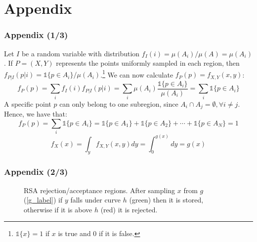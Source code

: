\documentclass{beamer}
\begin{document}
\section{Appendix}
\begin{frame}


\frametitle{Appendix (1/3)}
Let $I$ be a random variable with distribution $f_I(i)=\mu(A_i)/\mu(A)=\mu(A_i)$. If $P=(X,Y)$ represents the points uniformly sampled in each region, then $f_{P|I}(p|i)=\mathbb{1}\{p \in A_i\}/\mu(A_i)$.\footnote{$\mathbb{1}\{x\}=1$ if $x$ is true and $0$ if it is false.} We can now calculate $f_P(p)=f_{X,Y}(x,y)$:
$$f_P(p)=\sum_i f_I(i)f_{P|I}(p|i)=\sum_i \mu(A_i)\frac{\mathbb{1}\{p \in A_i\}}{\mu(A_i)}=\sum_i \mathbb{1}\{p \in A_i\}$$
A specific point $p$ can only belong to one subregion, since $A_i \cap A_j=\emptyset, \forall i\neq j$. Hence, we have that: 
$$f_P(p)=\sum_i \mathbb{1}\{p \in A_i\} = \mathbb{1}\{p \in A_1\} + \mathbb{1}\{p \in A_2\} + \dotsb + \mathbb{1}\{p \in A_N\} = 1$$
$$f_X(x)=\int_y f_{X,Y}(x,y)dy = \int_0^{g(x)}dy = g(x)$$
\end{frame}

\begin{frame}


\frametitle{Appendix (2/3)}
\begin{figure}[h]
\centering
{}
	\caption{RSA rejection/acceptance regions. After sampling $x$ from $g$ (\ref{g_label}) if $y$ falls under curve $h$ (green) then it is stored, otherwise if it is above $h$ (red) it is rejected.}
	\label{fig:RSA}
\end{figure}
\end{frame}
\end{document}
